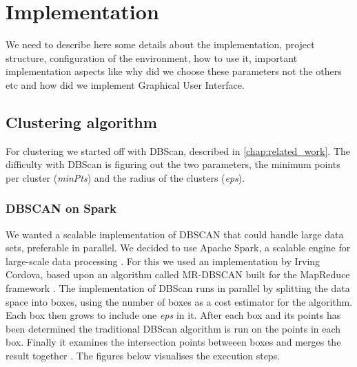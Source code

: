 \chapter{Implementation}
\label{cha:implementation}


We need to describe here some details about the implementation, project structure, configuration of the environment, how to use it, important implementation aspects like why did we choose these parameters not the others etc and how did we implement Graphical User Interface.


\section{Clustering algorithm}

For clustering we started off with DBScan, described in \autoref{chap:related_work}. The difficulty with DBScan is figuring out the two parameters, the minimum points per cluster (\textit{minPts}) and the radius of the clusters (\textit{eps}). 

\subsection{DBSCAN on Spark}

We wanted a scalable implementation of DBSCAN that could handle large data sets, preferable in parallel. We decided to use Apache Spark, a scalable engine for large-scale data processing \cite{spark}. For this we used an implementation by Irving Cordova, based upon an algorithm called MR-DBSCAN built for the MapReduce framework \cite{dbscan_on_spark}. The implementation of DBScan runs in parallel by splitting the data space into boxes, using the number of boxes as a cost estimator for the algorithm. Each box then grows to include one \textit{eps} in it. After each box and its points has been determined the traditional DBScan algorithm is run on the points in each box. Finally it examines the intersection points betweeen boxes and merges the result together \cite{vis_dbscan_on_spark}. The figures below visualises the execution steps.


